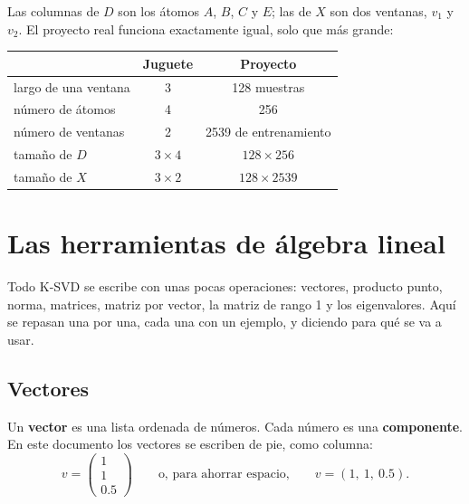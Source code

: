 \documentclass[11pt,letterpaper]{article}
\newcommand{\cA}[1]{\textcolor{atomoA}{#1}}
\newcommand{\cB}[1]{\textcolor{atomoB}{#1}}
\newcommand{\cC}[1]{\textcolor{atomoC}{#1}}
\newcommand{\cE}[1]{\textcolor{atomoE}{#1}}
\begin{document}
Las columnas de $D$ son los átomos \cA{$A$}, \cB{$B$}, \cC{$C$} y
\cE{$E$}; las de $X$ son dos ventanas, $v_1$ y $v_2$. El proyecto real
funciona exactamente igual, solo que más grande:

\begin{center}
\begin{tabular}{lcc}
    \toprule
                            & \textbf{Juguete} & \textbf{Proyecto} \\
    \midrule
    largo de una ventana    & 3            & 128 muestras \\
    número de átomos        & 4            & 256 \\
    número de ventanas      & 2            & 2539 de entrenamiento \\
    tamaño de $D$           & $3 \times 4$ & $128 \times 256$ \\
    tamaño de $X$           & $3 \times 2$ & $128 \times 2539$ \\
    \bottomrule
\end{tabular}
\end{center}

\newpage


\section{Las herramientas de álgebra lineal}

\begin{quick_sum}
    Todo K-SVD se escribe con unas pocas operaciones: vectores,
    producto punto, norma, matrices, matriz por vector, la matriz de
    rango 1 y los eigenvalores. Aquí se repasan una por una, cada una
    con un ejemplo, y diciendo para qué se va a usar.
\end{quick_sum}

\subsection*{Vectores}

\begin{definicion}[Vector]
    Un \textbf{vector} es una lista ordenada de números. Cada número es
    una \textbf{componente}. En este documento los vectores se escriben
    de pie, como columna:
    \[
        v = \begin{pmatrix} 1 \\ 1 \\ 0.5 \end{pmatrix}
        \qquad \text{o, para ahorrar espacio,} \qquad
        v = (1,\ 1,\ 0.5).
    \]
\end{definicion}
\end{document}
